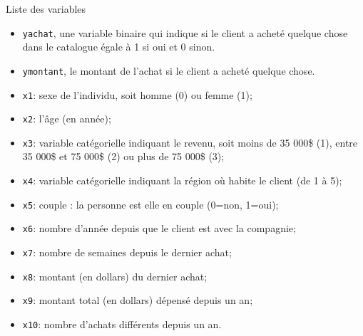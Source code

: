 \documentclass[
  ignorenonframetext,
]{beamer}
\providecommand{\tightlist}{%
  \setlength{\itemsep}{0pt}\setlength{\parskip}{0pt}}\usepackage{longtable,booktabs,array}
\begin{document}
\begin{frame}[fragile]{Liste des variables}
\protect\hypertarget{liste-des-variables}{}
\footnotesize

\begin{itemize}
\tightlist
\item
  \texttt{yachat}, une variable binaire qui indique si le client a
  acheté quelque chose dans le catalogue égale à 1 si oui et 0 sinon.
\item
  \texttt{ymontant}, le montant de l'achat si le client a acheté quelque
  chose.
\item
  \texttt{x1}: sexe de l'individu, soit homme (0) ou femme (1);
\item
  \texttt{x2}: l'âge (en année);
\item
  \texttt{x3}: variable catégorielle indiquant le revenu, soit moins de
  35 000\$ (1), entre 35 000\$ et 75 000\$ (2) ou plus de 75 000\$ (3);
\item
  \texttt{x4}: variable catégorielle indiquant la région où habite le
  client (de 1 à 5);
\item
  \texttt{x5}: couple : la personne est elle en couple (0=non, 1=oui);
\item
  \texttt{x6}: nombre d'année depuis que le client est avec la
  compagnie;
\item
  \texttt{x7}: nombre de semaines depuis le dernier achat;
\item
  \texttt{x8}: montant (en dollars) du dernier achat;
\item
  \texttt{x9}: montant total (en dollars) dépensé depuis un an;
\item
  \texttt{x10}: nombre d'achats différents depuis un an.
\end{itemize}

\normalsize
\end{frame}
\end{document}

